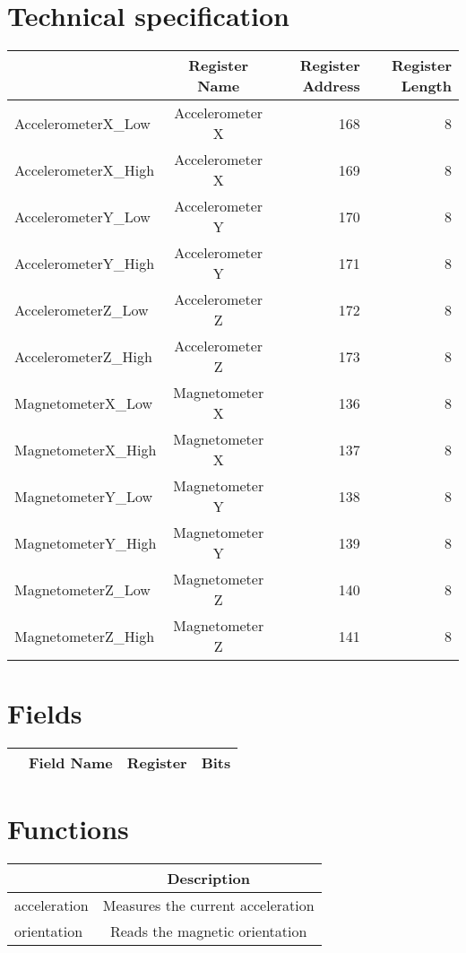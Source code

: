 \documentclass[a4paper,12pt,oneside,pdflatex,italian,final,twocolumn]{article}
\begin{document}
\section{Technical specification}
\centering
\begin{tabular}{lcrr}
\toprule
 & Register Name & Register Address & Register Length \\
\midrule
AccelerometerX_Low & Accelerometer X & 168 & 8 \\
AccelerometerX_High & Accelerometer X & 169 & 8 \\
AccelerometerY_Low & Accelerometer Y & 170 & 8 \\
AccelerometerY_High & Accelerometer Y & 171 & 8 \\
AccelerometerZ_Low & Accelerometer Z & 172 & 8 \\
AccelerometerZ_High & Accelerometer Z & 173 & 8 \\
MagnetometerX_Low & Magnetometer X & 136 & 8 \\
MagnetometerX_High & Magnetometer X & 137 & 8 \\
MagnetometerY_Low & Magnetometer Y & 138 & 8 \\
MagnetometerY_High & Magnetometer Y & 139 & 8 \\
MagnetometerZ_Low & Magnetometer Z & 140 & 8 \\
MagnetometerZ_High & Magnetometer Z & 141 & 8 \\
\bottomrule
\end{tabular}

\raggedright

\section{Fields}

\centering
\begin{tabular}{lcrr}
\toprule
  & Field Name & Register & Bits \\
\midrule
\bottomrule
\end{tabular}

\raggedright

\section{Functions}

\centering
\begin{tabular}{lc}
\toprule
  & Description \\
\midrule
acceleration & Measures the current acceleration \\
orientation & Reads the magnetic orientation \\
\bottomrule
\end{tabular}
\end{document}
